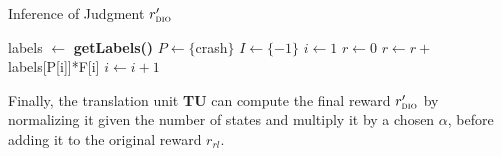 \begin{algorithm}[H]
  \caption{Inference of Judgment $r'_{\textsc{dio}{}}$}
  \begin{algorithmic}[1]
      
      \State labels $\gets$ \textbf{getLabels()} 
      \State $P \gets \{$crash$\}$  
      \State $I \gets \{-1\}$ 
      \State $i \gets 1$
      \State $r \gets 0$
         \State $r \gets r +$ labels[P[i]]*F[i] 
         \State $i \gets i+1$

      \EndWhile
      
      \EndProcedure
      
  \end{algorithmic}
  \end{algorithm}

  Finally, the translation unit \textbf{TU} can compute the final reward $r'_{\textsc{dio}{}}$ by normalizing it given the number of states and multiply it by a chosen $\alpha$, before adding it to the original reward $r_{rl}$. 


